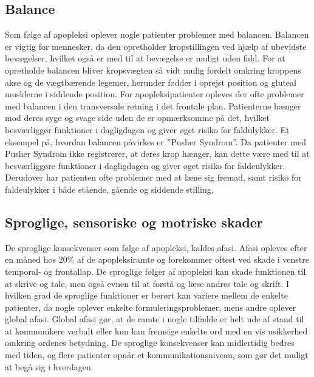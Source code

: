 \subsection{Balance}
Som følge af apopleksi oplever nogle patienter problemer med balancen. Balancen er vigtig for mennesker, da den opretholder kropstillingen ved hjælp af ubevidste bevægelser, hvilket også er med til at bevægelse er muligt uden fald. For at opretholde balancen bliver kropsvægten så vidt mulig fordelt omkring kroppens akse og de vægtbærende legemer, herunder fødder i oprejst position og gluteal musklerne i siddende position.\citep{Nichols1997}   
For apopleksipatienter opleves der ofte problemer med balancen i den transversale retning i det frontale plan. Patienterne hænger mod deres syge og svage side uden de er opmærksomme på det, hvilket besværliggør funktioner i dagligdagen og giver øget risiko for faldulykker. Et eksempel på, hvordan balancen påvirkes er ”Pusher Syndrom”. Da patienter med Pusher Syndrom ikke registrerer, at deres krop hænger, kan dette være med til at besværliggøre funktioner i dagligdagen og giver øget risiko for faldeulykker. Derudover har patienten ofte problemer med at læne sig fremad, samt risiko for faldeulykker i både stående, gående og siddende stilling. \citep{Karnath2003}


\subsection{Sproglige, sensoriske og motriske skader}
De sproglige konsekvenser som følge af apopleksi, kaldes afasi. Afasi opleves efter en måned hos 20\% af de apopleksiramte og forekommer oftest ved skade i venstre temporal- og frontallap. De sproglige følger af apopleksi kan skade funktionen til at skrive og tale, men også evnen til at forstå og læse andres tale og skrift. I hvilken grad de sproglige funktioner er berørt kan variere mellem de enkelte patienter, da nogle oplever enkelte formuleringsproblemer, mens andre oplever global afasi. Global afasi gør, at de ramte i nogle tilfælde er helt ude af stand til at kommunikere verbalt eller kun kan fremsige enkelte ord med en vis usikkerhed omkring ordenes betydning.
De sproglige konsekvenser kan midlertidig bedres med tiden, og flere patienter opnår et kommunikationsniveau, som gør det muligt at begå sig i hverdagen.\citep{Muus2008}


